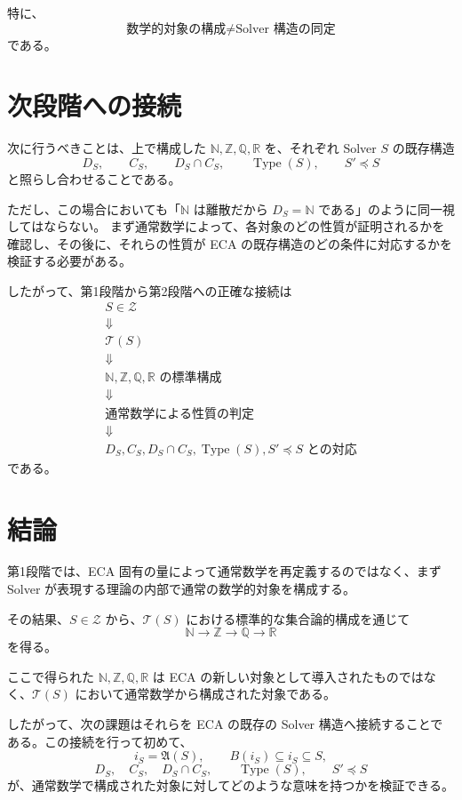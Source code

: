 \documentclass[a4paper,11pt]{article}
\newcommand{\SubSolver}{\preceq}
\begin{document}
特に、
\[
\boxed{\text{数学的対象の構成}\neq\text{Solver 構造の同定}}
\]
である。

\section{次段階への接続}
次に行うべきことは、上で構成した $\mathbb{N},\mathbb{Z},\mathbb{Q},\mathbb{R}$ を、それぞれ Solver $S$ の既存構造
\[
D_S,\qquad C_S,\qquad D_S\cap C_S,\qquad \operatorname{Type}(S),\qquad S'\SubSolver S
\]
と照らし合わせることである。

ただし、この場合においても「$\mathbb{N}$ は離散だから $D_S=\mathbb{N}$ である」のように同一視してはならない。
まず通常数学によって、各対象のどの性質が証明されるかを確認し、その後に、それらの性質が ECA の既存構造のどの条件に対応するかを検証する必要がある。

したがって、第1段階から第2段階への正確な接続は
\[
\boxed{\begin{array}{c}S\in\mathcal{Z}\\\Downarrow\\\mathcal{T}(S)\\\Downarrow\\\mathbb{N},\mathbb{Z},\mathbb{Q},\mathbb{R}\text{ の標準構成}\\\Downarrow\\\text{通常数学による性質の判定}\\\Downarrow\\D_S,C_S,D_S\cap C_S,\operatorname{Type}(S),S'\SubSolver S\text{ との対応}\end{array}}
\]
である。

\section{結論}
第1段階では、ECA 固有の量によって通常数学を再定義するのではなく、まず Solver が表現する理論の内部で通常の数学的対象を構成する。

その結果、$S\in\mathcal{Z}$ から、$\mathcal{T}(S)$ における標準的な集合論的構成を通じて
\[
\boxed{\mathbb{N}\longrightarrow\mathbb{Z}\longrightarrow\mathbb{Q}\longrightarrow\mathbb{R}}
\]
を得る。

ここで得られた $\mathbb{N},\mathbb{Z},\mathbb{Q},\mathbb{R}$ は ECA の新しい対象として導入されたものではなく、$\mathcal{T}(S)$ において通常数学から構成された対象である。

したがって、次の課題はそれらを ECA の既存の Solver 構造へ接続することである。この接続を行って初めて、
\[
i_S=\mathfrak{A}(S),\qquad B(i_S)\subseteq i_S\subseteq S,
\]
\[
D_S,\quad C_S,\quad D_S\cap C_S,\qquad \operatorname{Type}(S),\qquad S'\SubSolver S
\]
が、通常数学で構成された対象に対してどのような意味を持つかを検証できる。
\end{document}
